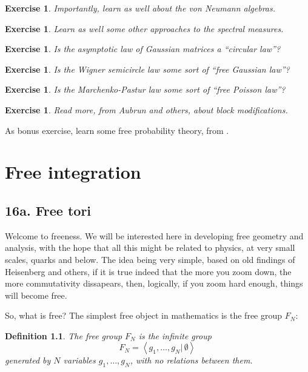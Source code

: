 \documentclass[12pt]{amsbook}
\newtheorem{definition}[theorem]{Definition}
\newtheorem{exercise}[theorem]{Exercise}
\begin{document}
\begin{exercise}
Importantly, learn as well about the von Neumann algebras.
\end{exercise}

\begin{exercise}
Learn as well some other approaches to the spectral measures.
\end{exercise}

\begin{exercise}
Is the asymptotic law of Gaussian matrices a ``circular law''?
\end{exercise}

\begin{exercise}
Is the Wigner semicircle law some sort of ``free Gaussian law''?
\end{exercise}

\begin{exercise}
Is the Marchenko-Pastur law some sort of ``free Poisson law''?
\end{exercise}

\begin{exercise}
Read more, from Aubrun and others, about block modifications.
\end{exercise}

As bonus exercise, learn some free probability theory, from \cite{vdn}.

\chapter{Free integration}

\section*{16a. Free tori} 

Welcome to freeness. We will be interested here in developing free geometry and analysis, with the hope that all this might be related to physics, at very small scales, quarks and below. The idea being very simple, based on old findings of Heisenberg and others, if it is true indeed that the more you zoom down, the more commutativity dissapears, then, logically, if you zoom hard enough, things will become free.

\bigskip

So, what is free? The simplest free object in mathematics is the free group $F_N$:

\begin{definition}
The free group $F_N$ is the infinite group
$$F_N=\left<g_1,\ldots,g_N\Big|\,\emptyset\right>$$
generated by $N$ variables $g_1,\ldots,g_N$, with no relations between them.
\end{definition}
\end{document}
